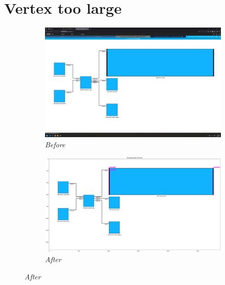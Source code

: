 \documentclass{article}
\begin{document}
\section{Vertex too large}
\begin{figure}[H]
    \centering
    \begin{subfigure}[t]{0.9\textwidth}
        \centering
        \includegraphics[width=\textwidth]{testcases/vertex_too_large/133708-898563_input_image.png}
        \caption*{\textit{Before}}
    \end{subfigure}
    \newline
    \begin{subfigure}[t]{0.9\textwidth}
        \centering
        \includegraphics[width=\textwidth]{testcases/vertex_too_large/133744-868019_element_bbox_errors_labeled_colored.png}
        \caption*{\textit{After}}
    \end{subfigure}
    \label{fig:vertex_too_large}
\end{figure}
\newpage
\end{document}
